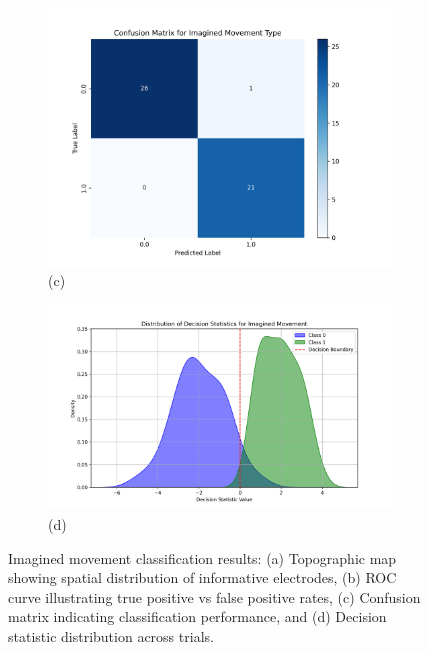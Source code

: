 \documentclass[
  letterpaper,
  DIV=11,
  numbers=noendperiod]{scrartcl}
\begin{document}
\begin{figure}
{\begin{figure}
\centering
\includegraphics[width=1\textwidth,height=\textheight]{figures/cross-validated-results/linear/imagined-imagined-confusion-matrix.png}
\caption{(c)}\label{fig:imagined-imagined-confusion-matrix}
\end{figure}

\begin{figure}
\centering
\includegraphics[width=1\textwidth,height=\textheight]{figures/cross-validated-results/linear/imagined-imagined-decision-statistic.png}
\caption{(d)}\label{fig:imagined-imagined-decision-statistic}
\end{figure}

}

\caption{\label{fig-imagined-imagined-results}Imagined movement
classification results: (a) Topographic map showing spatial distribution
of informative electrodes, (b) ROC curve illustrating true positive vs
false positive rates, (c) Confusion matrix indicating classification
performance, and (d) Decision statistic distribution across trials.}

\end{figure}%
\end{document}
